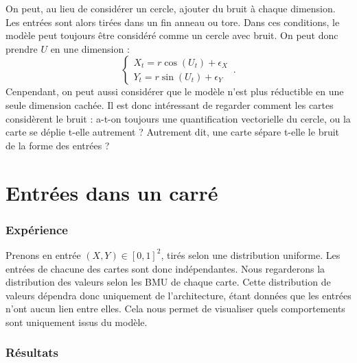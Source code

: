 On peut, au lieu de considérer un cercle, ajouter du bruit à chaque dimension. Les entrées sont alors tirées dans un fin anneau ou tore. Dans ces conditions, le modèle peut toujours être considéré comme un cercle avec bruit. On peut donc prendre $U$ en une dimension :  
$$
 \begin{cases}
     X_t = r  \cos(U_t) + \epsilon_X\\
     Y_t = r \sin(U_t) + \epsilon_Y
    \end{cases}\,.
$$
Cenpendant, on peut aussi considérer que le modèle n'est plus réductible en une seule dimension cachée.
Il est donc intéressant de regarder comment les cartes considèrent le bruit : a-t-on toujours une quantification vectorielle du cercle, ou la carte se déplie t-elle autrement ? Autrement dit, une carte sépare t-elle le bruit de la forme des entrées ?

\section{Entrées dans un carré}

\subsubsection{Expérience}
Prenons en entrée $(X,Y) \in [0,1]^2$, tirés selon une distribution uniforme. Les entrées de chacune des cartes sont donc indépendantes. Nous regarderons la distribution des valeurs selon les BMU de chaque carte. Cette distribution de valeurs dépendra donc uniquement de l'architecture, étant données que les entrées n'ont aucun lien entre elles. Cela nous permet de visualiser quels comportements sont uniquement issus du modèle.
 
\subsubsection{Résultats}

